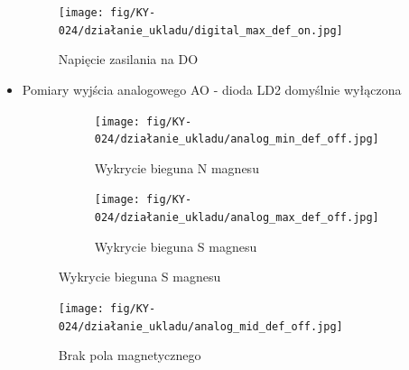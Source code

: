 \documentclass[11pt, a4paper]{article}
\begin{document}
\begin{itemize}
\vspace{0.25cm}
\begin{figure}[h]
    \centering
    \texttt{[image: fig/KY-024/działanie\_ukladu/digital\_max\_def\_on.jpg]}
    \caption{Napięcie zasilania na DO}
    \label{fig:_digital_max_def_on}
\end{figure}
\vspace{0.25cm}

\newpage

\item{Pomiary wyjścia analogowego AO - dioda LD2 domyślnie wyłączona}
\begin{figure}[h]
\centering
\begin{subfigure}{.5\textwidth}
\centering
\texttt{[image: fig/KY-024/działanie\_ukladu/analog\_min\_def\_off.jpg]}
\caption{Wykrycie bieguna N magnesu}
\label{fig:_analog_min_def_on}
\end{subfigure}%
\begin{subfigure}{.5\textwidth}
\centering
\texttt{[image: fig/KY-024/działanie\_ukladu/analog\_max\_def\_off.jpg]}
\caption{Wykrycie bieguna S magnesu}
\label{fig:_analog_max_def_on}
\end{subfigure}
\label{fig:miernik3}
\end{figure}

\begin{figure}[h]
    \centering
    \texttt{[image: fig/KY-024/działanie\_ukladu/analog\_mid\_def\_off.jpg]}
    \caption{Brak pola magnetycznego}
    \label{fig:_analog_mid_def_on}
\end{figure}
\vspace{0.25cm}



\end{itemize}
\end{document}
